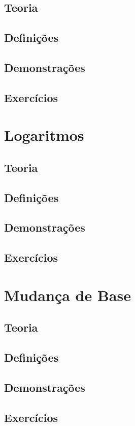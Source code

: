 \documentclass[portuguese, 12pt, a4paper]{article}
\begin{document}
	\subsection{Teoria}
	\subsection{Definições}
	\subsection{Demonstrações}
	\subsection{Exercícios}
	
	\section{Logaritmos}
	\subsection{Teoria}
	\subsection{Definições}
	\subsection{Demonstrações}
	\subsection{Exercícios}
	
	\section{Mudança de Base}
	\subsection{Teoria}
	\subsection{Definições}
	\subsection{Demonstrações}
	\subsection{Exercícios}
	
\end{document}
